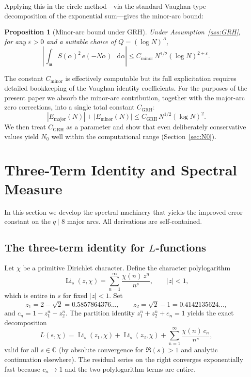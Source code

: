 \documentclass[11pt,a4paper]{article}
\theoremstyle{plain}
\newtheorem{proposition}[theorem]{Proposition}
\theoremstyle{definition}
\theoremstyle{remark}
\numberwithin{equation}{section}
\numberwithin{table}{section}
\DeclareMathOperator{\Li}{Li}
\def\diff{\mathop{}\!\mathrm{d}}
\newcommand{\C}{\mathbb{C}}
\newcommand{\frakm}{\mathfrak{m}}
\begin{document}
Applying this in the circle method---via the standard Vaughan-type
decomposition of the exponential sum---gives the minor-arc bound:

\begin{proposition}[Minor-arc bound under GRH]
\label{prop:minor}
Under Assumption~\ref{ass:GRH}, for any $\varepsilon>0$ and a suitable
choice of $Q=(\log N)^A$,
\begin{equation}
  \left|\int_{\frakm} S(\alpha)^2\,e(-N\alpha)\,\diff\alpha\right|
  \le C_{\mathrm{minor}}\,N^{1/2}(\log N)^{2+\varepsilon}.
\end{equation}
\end{proposition}

The constant $C_{\mathrm{minor}}$ is effectively computable but its full
explicitation requires detailed bookkeeping of the Vaughan identity
coefficients.  For the purposes of the present paper we absorb the
minor-arc contribution, together with the major-arc zero corrections, into
a single total constant $C_{\mathrm{GRH}}$:
\begin{equation}
  |E_{\mathrm{major}}(N)| + |E_{\mathrm{minor}}(N)|
  \le C_{\mathrm{GRH}}\,N^{1/2}(\log N)^2.
\end{equation}
We then treat $C_{\mathrm{GRH}}$ as a parameter and show that even
deliberately conservative values yield $N_0$ well within the computational
range (Section~\ref{sec:N0}).

\section{Three-Term Identity and Spectral Measure}
\label{sec:spectral}

In this section we develop the spectral machinery that yields the
improved error constant on the $q\mid 8$ major arcs.  All derivations
are self-contained.

\subsection{The three-term identity for $L$-functions}

Let $\chi$ be a primitive Dirichlet character.  Define the character
polylogarithm
\begin{equation}
  \Li_s(z,\chi) = \sum_{n=1}^\infty \frac{\chi(n)\,z^n}{n^s},
  \qquad |z|<1,
\end{equation}
which is entire in $s$ for fixed $|z|<1$.  Set
\begin{equation}
  z_1 = 2-\sqrt{2} = 0.5857864376\ldots,\qquad
  z_2 = \sqrt{2}-1 = 0.4142135624\ldots,
\end{equation}
and $c_n=1-z_1^n-z_2^n$.  The partition identity $z_1^n+z_2^n+c_n=1$
yields the exact decomposition
\begin{equation}
\label{eq:three-term}
  L(s,\chi) = \Li_s(z_1,\chi) + \Li_s(z_2,\chi)
  + \sum_{n=1}^\infty \frac{\chi(n)\,c_n}{n^s},
\end{equation}
valid for all $s\in\C$ (by absolute convergence for $\Re(s)>1$ and
analytic continuation elsewhere).  The residual series on the right
converges exponentially fast because $c_n\to 1$ and the two polylogarithm
terms are entire.
\end{document}
